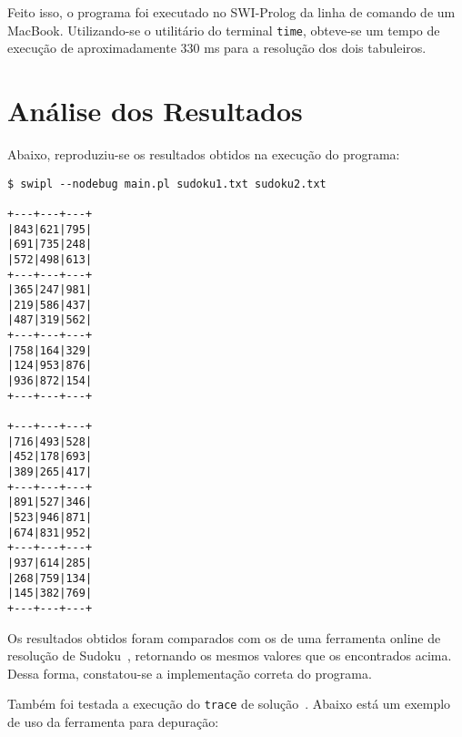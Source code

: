\documentclass[journal,transmag]{IEEEtran}
\begin{document}
Feito isso, o programa foi executado no SWI-Prolog da linha de comando de um
MacBook. Utilizando-se o utilitário do terminal \texttt{time}, obteve-se um
tempo de execução de aproximadamente 330 ms para a resolução dos dois
tabuleiros.


\section{Análise dos Resultados}
Abaixo, reproduziu-se os resultados obtidos na execução do programa:

\begin{footnotesize}\begin{verbatim}
$ swipl --nodebug main.pl sudoku1.txt sudoku2.txt

+---+---+---+
|843|621|795|
|691|735|248|
|572|498|613|
+---+---+---+
|365|247|981|
|219|586|437|
|487|319|562|
+---+---+---+
|758|164|329|
|124|953|876|
|936|872|154|
+---+---+---+

+---+---+---+
|716|493|528|
|452|178|693|
|389|265|417|
+---+---+---+
|891|527|346|
|523|946|871|
|674|831|952|
+---+---+---+
|937|614|285|
|268|759|134|
|145|382|769|
+---+---+---+
\end{verbatim}\end{footnotesize}

Os resultados obtidos foram comparados com os de uma ferramenta online de
resolução de Sudoku~\cite{online-solver}, retornando os mesmos valores que os
encontrados acima. Dessa forma, constatou-se a implementação correta do
programa.

Também foi testada a execução do \texttt{trace} de solução~\cite{trace}. Abaixo
está um exemplo de uso da ferramenta para depuração:
\end{document}

